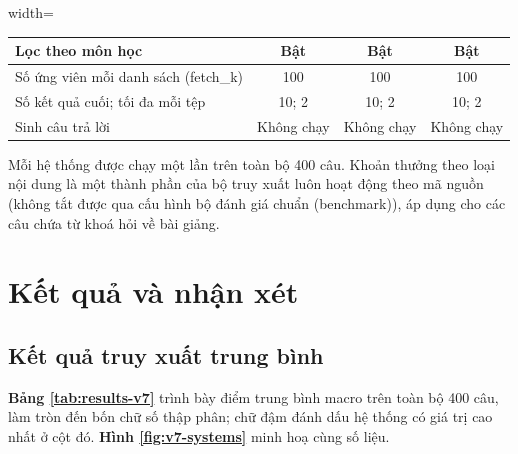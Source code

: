 \begin{table}[ht]
\begin{adjustbox}{width=\textwidth}
\begin{tabular}{|l|c|c|c|}
            \hline
            Lọc theo môn học                           & Bật                           & Bật                                   & Bật                                                                    \\
            \hline
            Số ứng viên mỗi danh sách (fetch\_k)       & 100                           & 100                                   & 100                                                                    \\
            \hline
            Số kết quả cuối; tối đa mỗi tệp            & 10; 2                         & 10; 2                                 & 10; 2                                                                  \\
            \hline
            Sinh câu trả lời                           & Không chạy                    & Không chạy                            & Không chạy                                                             \\
            \hline
        \end{tabular}
    \end{adjustbox}
\end{table}

\bigbreak\noindent
Mỗi hệ thống được chạy một lần trên toàn bộ 400 câu. Khoản thưởng theo loại nội dung là một thành phần của bộ truy xuất luôn hoạt động theo mã nguồn (không tắt được qua cấu hình bộ đánh giá chuẩn (benchmark)), áp dụng cho các câu chứa từ khoá hỏi về bài giảng.


\section{Kết quả và nhận xét}\label{sec:ket-qua}

\subsection{Kết quả truy xuất trung bình}

\textbf{Bảng \ref{tab:results-v7}} trình bày điểm trung bình macro trên toàn bộ 400 câu, làm tròn đến bốn chữ số thập phân; chữ đậm đánh dấu hệ thống có giá trị cao nhất ở cột đó. \textbf{Hình \ref{fig:v7-systems}} minh hoạ cùng số liệu.

